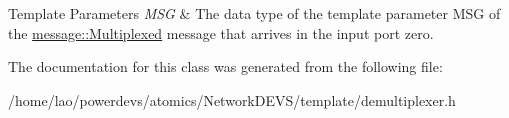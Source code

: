 \begin{DoxyTemplParams}{Template Parameters}
{\em M\+SG} & The data type of the template parameter M\+SG of the \hyperlink{structmessage_1_1Multiplexed}{message\+::\+Multiplexed} message that arrives in the input port zero. \\
\hline
\end{DoxyTemplParams}


The documentation for this class was generated from the following file\+:\begin{DoxyCompactItemize}
\item 
/home/lao/powerdevs/atomics/\+Network\+D\+E\+V\+S/template/demultiplexer.\+h\end{DoxyCompactItemize}
